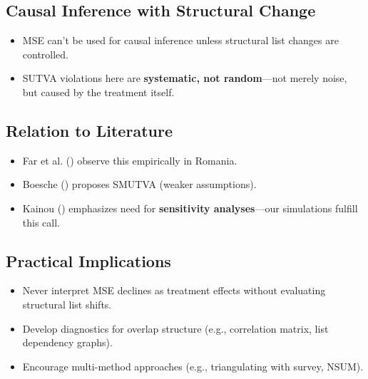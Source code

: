 \documentclass[
  12pt,
]{article}
\providecommand{\tightlist}{%
  \setlength{\itemsep}{0pt}\setlength{\parskip}{0pt}}\usepackage{longtable,booktabs,array}
\theoremstyle{plain}
\theoremstyle{definition}
\begin{document}
\subsection{Causal Inference with Structural
Change}\label{causal-inference-with-structural-change}

\begin{itemize}
\tightlist
\item
  MSE can't be used for causal inference unless structural list changes
  are controlled.\\
\item
  SUTVA violations here are \textbf{systematic, not random}---not merely
  noise, but caused by the treatment itself.
\end{itemize}

\subsection{Relation to Literature}\label{relation-to-literature}

\begin{itemize}
\tightlist
\item
  Far et al. () observe this
  empirically in Romania.
\item
  Boesche () proposes SMUTVA
  (weaker assumptions).
\item
  Kainou () emphasizes need for
  \textbf{sensitivity analyses}---our simulations fulfill this call.
\end{itemize}

\subsection{Practical Implications}\label{practical-implications}

\begin{itemize}
\tightlist
\item
  Never interpret MSE declines as treatment effects without evaluating
  structural list shifts.\\
\item
  Develop diagnostics for overlap structure (e.g., correlation matrix,
  list dependency graphs).\\
\item
  Encourage multi-method approaches (e.g., triangulating with survey,
  NSUM).
\end{itemize}
\end{document}
